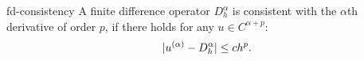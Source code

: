 \begin{Definition}{fd-consistency}
  A finite difference operator $D^\alpha_h$ is consistent with the
  $\alpha$th derivative of order $p$, if there holds for any
  $u\in C^{\alpha+p}$:
  \begin{gather}
    \label{eq:fd-consistency:def}
    \lvert u^{(\alpha)} - D^\alpha_h\rvert \le c h^p.
  \end{gather}
\end{Definition}
